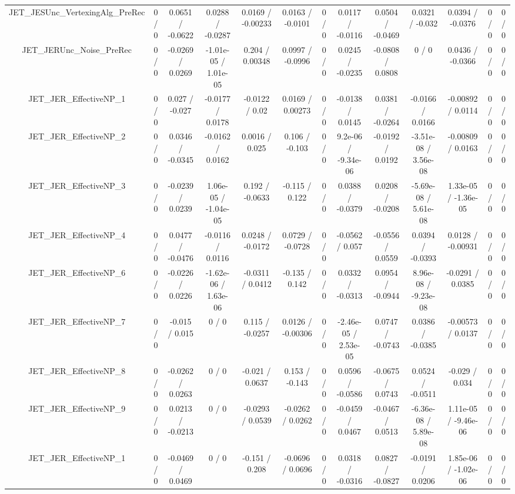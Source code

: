 \documentclass[10pt]{article}
\begin{document}
\begin{table}[htbp]
\begin{center}
\begin{tabular}{|c|c|c|c|c|c|c|c|c|c|c|c|c|}
  JET_JESUnc_VertexingAlg_PreRec & 0 / 0 & 0.0651 / -0.0622 & 0.0288 / -0.0287 & 0.0169 / -0.00233 & 0.0163 / -0.0101 & 0 / 0 & 0.0117 / -0.0116 & 0.0504 / -0.0469 & 0.0321 / -0.032 & 0.0394 / -0.0376 & 0 / 0 & 0 / 0 \\ 
  JET_JERUnc_Noise_PreRec & 0 / 0 & -0.0269 / 0.0269 & -1.01e-05 / 1.01e-05 & 0.204 / 0.00348 & 0.0997 / -0.0996 & 0 / 0 & 0.0245 / -0.0235 & -0.0808 / 0.0808 & 0 / 0 & 0.0436 / -0.0366 & 0 / 0 & 0 / 0 \\ 
  JET_JER_EffectiveNP_1 & 0 / 0 & 0.027 / -0.027 & -0.0177 / 0.0178 & -0.0122 / 0.02 & 0.0169 / 0.00273 & 0 / 0 & -0.0138 / 0.0145 & 0.0381 / -0.0264 & -0.0166 / 0.0166 & -0.00892 / 0.0114 & 0 / 0 & 0 / 0 \\ 
  JET_JER_EffectiveNP_2 & 0 / 0 & 0.0346 / -0.0345 & -0.0162 / 0.0162 & 0.0016 / 0.025 & 0.106 / -0.103 & 0 / 0 & 9.2e-06 / -9.34e-06 & -0.0192 / 0.0192 & -3.51e-08 / 3.56e-08 & -0.00809 / 0.0163 & 0 / 0 & 0 / 0 \\ 
  JET_JER_EffectiveNP_3 & 0 / 0 & -0.0239 / 0.0239 & 1.06e-05 / -1.04e-05 & 0.192 / -0.0633 & -0.115 / 0.122 & 0 / 0 & 0.0388 / -0.0379 & 0.0208 / -0.0208 & -5.69e-08 / 5.61e-08 & 1.33e-05 / -1.36e-05 & 0 / 0 & 0 / 0 \\ 
  JET_JER_EffectiveNP_4 & 0 / 0 & 0.0477 / -0.0476 & -0.0116 / 0.0116 & 0.0248 / -0.0172 & 0.0729 / -0.0728 & 0 / 0 & -0.0562 / 0.057 & -0.0556 / 0.0559 & 0.0394 / -0.0393 & 0.0128 / -0.00931 & 0 / 0 & 0 / 0 \\ 
  JET_JER_EffectiveNP_6 & 0 / 0 & -0.0226 / 0.0226 & -1.62e-06 / 1.63e-06 & -0.0311 / 0.0412 & -0.135 / 0.142 & 0 / 0 & 0.0332 / -0.0313 & 0.0954 / -0.0944 & 8.96e-08 / -9.23e-08 & -0.0291 / 0.0385 & 0 / 0 & 0 / 0 \\ 
  JET_JER_EffectiveNP_7 & 0 / 0 & -0.015 / 0.015 & 0 / 0 & 0.115 / -0.0257 & 0.0126 / -0.00306 & 0 / 0 & -2.46e-05 / 2.53e-05 & 0.0747 / -0.0743 & 0.0386 / -0.0385 & -0.00573 / 0.0137 & 0 / 0 & 0 / 0 \\ 
  JET_JER_EffectiveNP_8 & 0 / 0 & -0.0262 / 0.0263 & 0 / 0 & -0.021 / 0.0637 & 0.153 / -0.143 & 0 / 0 & 0.0596 / -0.0586 & -0.0675 / 0.0743 & 0.0524 / -0.0511 & -0.029 / 0.034 & 0 / 0 & 0 / 0 \\ 
  JET_JER_EffectiveNP_9 & 0 / 0 & 0.0213 / -0.0213 & 0 / 0 & -0.0293 / 0.0539 & -0.0262 / 0.0262 & 0 / 0 & -0.0459 / 0.0467 & -0.0467 / 0.0513 & -6.36e-08 / 5.89e-08 & 1.11e-05 / -9.46e-06 & 0 / 0 & 0 / 0 \\ 
  JET_JER_EffectiveNP_1 & 0 / 0 & -0.0469 / 0.0469 & 0 / 0 & -0.151 / 0.208 & -0.0696 / 0.0696 & 0 / 0 & 0.0318 / -0.0316 & 0.0827 / -0.0827 & -0.0191 / 0.0206 & 1.85e-06 / -1.02e-06 & 0 / 0 & 0 / 0 \\ 

\end{tabular}
\end{center}
\end{table}
\end{document}
